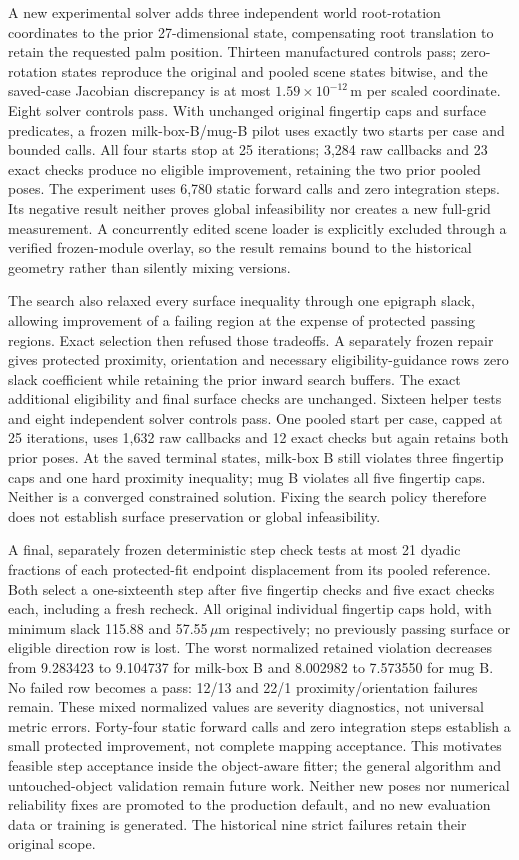 \documentclass[10pt,letterpaper]{article}
\begin{document}
A new experimental solver adds three independent world root-rotation
coordinates to the prior 27-dimensional state, compensating root translation
to retain the requested palm position. Thirteen manufactured controls pass;
zero-rotation states reproduce the original and pooled scene states bitwise,
and the saved-case Jacobian discrepancy is at most
$1.59\times10^{-12}$\,m per scaled coordinate. Eight solver controls pass.
With unchanged original fingertip caps and surface predicates, a frozen
milk-box-B/mug-B pilot uses exactly two starts per case and bounded calls.
All four starts stop at 25 iterations; 3,284 raw callbacks and 23 exact checks
produce no eligible improvement, retaining the two prior pooled poses.
The experiment uses 6,780 static forward calls and zero integration steps.
Its negative result neither proves global infeasibility nor creates a new
full-grid measurement. A concurrently edited scene loader is explicitly
excluded through a verified frozen-module overlay, so the result remains
bound to the historical geometry rather than silently mixing versions.

The search also relaxed every surface inequality through one epigraph slack,
allowing improvement of a failing region at the expense of protected passing
regions. Exact selection then refused those tradeoffs. A separately frozen
repair gives protected proximity, orientation and necessary eligibility-guidance
rows zero slack coefficient while retaining the prior inward search buffers.
The exact additional eligibility and final surface checks are unchanged.
Sixteen helper tests and eight independent solver controls pass. One pooled
start per case, capped at 25 iterations, uses 1,632 raw callbacks and 12 exact
checks but again retains both prior poses. At the saved terminal states,
milk-box B still violates three fingertip caps and one hard proximity
inequality; mug B violates all five fingertip caps. Neither is a converged
constrained solution. Fixing the search policy therefore does not establish
surface preservation or global infeasibility.

A final, separately frozen deterministic step check tests at most 21 dyadic
fractions of each protected-fit endpoint displacement from its pooled reference.
Both select a one-sixteenth step after five fingertip checks and five exact
checks each, including a fresh recheck. All original individual fingertip caps
hold, with minimum slack 115.88 and 57.55\,$\mu$m respectively; no previously
passing surface or eligible direction row is lost. The worst normalized
retained violation decreases from 9.283423 to 9.104737 for milk-box B and
8.002982 to 7.573550 for mug B. No failed row becomes a pass: 12/13 and 22/1
proximity/orientation failures remain. These mixed normalized values are
severity diagnostics, not universal metric errors. Forty-four static forward
calls and zero integration steps establish a small protected improvement, not
complete mapping acceptance. This motivates feasible step acceptance inside
the object-aware fitter; the general algorithm and untouched-object validation
remain future work. Neither new poses nor numerical reliability fixes are
promoted to the production default, and no new evaluation data or training is
generated. The historical nine strict failures retain their original scope.
\end{document}
